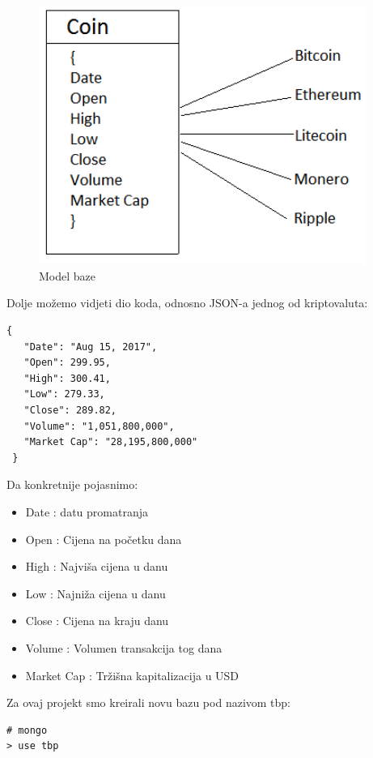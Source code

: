 \documentclass[a4paper,12pt]{foi}
\begin{document}
\begin{figure}[h]
\centering 
\includegraphics[width=0.95\textwidth]{model.png}
\caption{Model baze}
\label{slika-2}
\end{figure}


Dolje možemo vidjeti dio koda, odnosno JSON-a jednog od kriptovaluta:
\lstset{commentstyle=\textit,language=python}
\begin{lstlisting}[frame=tb]
{
   "Date": "Aug 15, 2017",
   "Open": 299.95,
   "High": 300.41,
   "Low": 279.33,
   "Close": 289.82,
   "Volume": "1,051,800,000",
   "Market Cap": "28,195,800,000"
 }
\end{lstlisting}


Da konkretnije pojasnimo:
\begin{itemize}
\item Date : datu promatranja
\item Open : Cijena na početku dana
\item High : Najviša cijena u danu
\item Low : Najniža cijena u danu
\item Close : Cijena na kraju danu
\item Volume : Volumen transakcija tog dana
\item Market Cap : Tržišna kapitalizacija u USD
\end{itemize}


Za ovaj projekt smo kreirali novu bazu pod nazivom tbp:
\lstset{commentstyle=\textit,language=python}
\begin{lstlisting}[frame=tb]
# mongo
> use tbp
\end{lstlisting}
\end{document}
